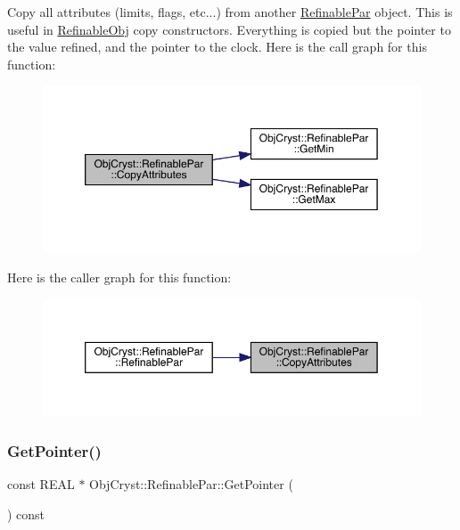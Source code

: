Copy all attributes (limits, flags, etc...) from another \mbox{\hyperlink{class_obj_cryst_1_1_refinable_par}{Refinable\+Par}} object. This is useful in \mbox{\hyperlink{class_obj_cryst_1_1_refinable_obj}{Refinable\+Obj}} copy constructors. Everything is copied but the pointer to the value refined, and the pointer to the clock. Here is the call graph for this function\+:
\nopagebreak
\begin{figure}[H]
\begin{center}
\leavevmode
\includegraphics[width=350pt]{class_obj_cryst_1_1_refinable_par_a5882aec9561125f6e81b81f175031652_cgraph}
\end{center}
\end{figure}
Here is the caller graph for this function\+:
\nopagebreak
\begin{figure}[H]
\begin{center}
\leavevmode
\includegraphics[width=350pt]{class_obj_cryst_1_1_refinable_par_a5882aec9561125f6e81b81f175031652_icgraph}
\end{center}
\end{figure}
\mbox{\label{class_obj_cryst_1_1_refinable_par_a675b8d257ac8e88efd2eb47cd478ad99}} 
\subsubsection{\texorpdfstring{GetPointer()}{GetPointer()}}
{\footnotesize\ttfamily const R\+E\+AL $\ast$ Obj\+Cryst\+::\+Refinable\+Par\+::\+Get\+Pointer (\begin{DoxyParamCaption}{ }\end{DoxyParamCaption}) const}

